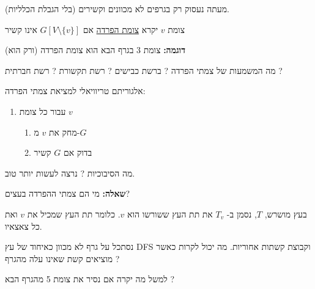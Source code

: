 מעתה נעסוק רק בגרפים לא מכוונים וקשירים (בלי הגבלת הכלליות).
\begin{definition}
צומת $v$ יקרא 
\underline{צומת הפרדה}
אם
$G[V \setminus \{v\}]$
אינו קשיר
\end{definition}
\textbf{דוגמה:}
צומת 3 בגרף הבא הוא צומת הפרדה (ורק הוא)
\begin{center}
\end{center}

מה המשמעות של צמתי הפרדה ? ברשת כבישים ? רשת תקשורת ? רשת חברתית ?

אלגוריתם טריוויאלי למציאת צמתי הפרדה:
\begin{enumerate}
\item
עבור כל צומת $v$
	\begin{enumerate}
	\item
	מחק את $v$ מ-$G$
	\item
	בדוק אם $G$ קשיר
	\end{enumerate}
\end{enumerate}

מה הסיבוכיות ? נרצה לעשות יותר טוב.

\textbf{שאלה:}
מי הם צמתי ההפרדה בעצים?
\begin{center}
\end{center}
בעץ מושרש, $T$, נסמן ב-%
$T_v$
את תת העץ ששורשו הוא $v$. כלומר תת העץ שמכיל את $v$ ואת כל צאצאיו.


נסתכל על גרף לא מכוון כאיחוד של עץ DFS וקבוצת קשתות אחוריות.
מה יכול לקרות כאשר מוציאים קשת שאינו עלה מהגרף ?

למשל מה יקרה אם נסיר את צומת 5 מהגרף הבא ?
\begin{center}
\end{center}


